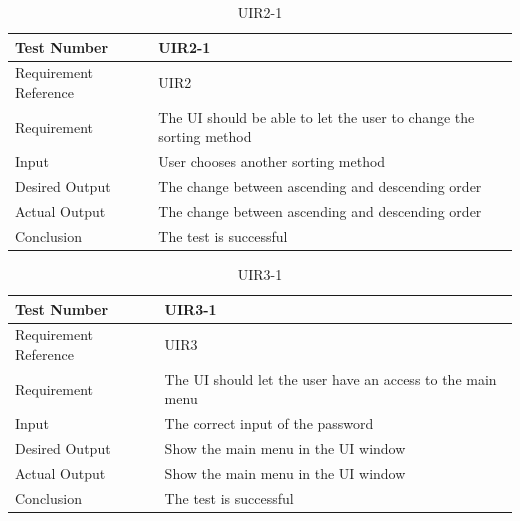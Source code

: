 \documentclass[12pt, titlepage]{article}
\begin{document}
\begin{table}[H]
\begin{center}
\begin{tabular}{|l | m{9cm}|}
\hline
  Test Number & UIR2-1\\
  \hline
  Requirement Reference & UIR2\\
  \hline
  Requirement & The UI should be able to let the user to change the sorting method\\
  \hline
  Input & User chooses another sorting method\\
  \hline
  Desired Output & The change between ascending and descending order\\
  \hline
  Actual Output & The change between ascending and descending order\\
  \hline
  Conclusion & The test is successful\\
  \hline
\end{tabular}
\end{center}   
\caption{UIR2-1}
\end{table}

\begin{table}[H]
\begin{center}
\begin{tabular}{|l | m{9cm}|}
\hline
  Test Number & UIR3-1\\
  \hline
  Requirement Reference & UIR3\\
  \hline
  Requirement & The UI should let the user have an access to the main menu\\
  \hline
  Input & The correct input of the password\\
  \hline
  Desired Output & Show the main menu in the UI window\\
  \hline
  Actual Output & Show the main menu in the UI window\\
  \hline
  Conclusion & The test is successful\\
  \hline
\end{tabular}
\end{center}   
\caption{UIR3-1}
\end{table}
\end{document}

